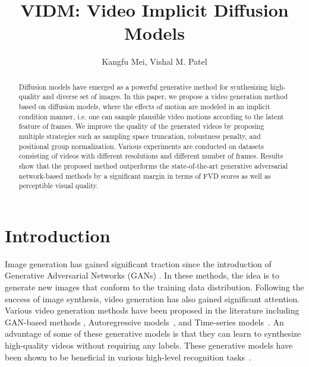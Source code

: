 \documentclass[letterpaper]{article}
\title{VIDM: Video Implicit Diffusion Models}
\author{
    Kangfu Mei,
    Vishal M. Patel
}
\begin{document}

\begin{abstract}
Diffusion models have emerged as a powerful generative method for synthesizing high-quality and diverse set of images.  In this paper, we propose a video generation method based on diffusion models, where the effects of motion are modeled in an implicit condition manner, i.e. one can sample plausible video motions according to the latent feature of frames.  We improve the quality of the generated videos by proposing multiple strategies such as sampling space truncation, robustness penalty, and positional group normalization.  Various experiments are conducted on datasets consisting of videos with different resolutions and different number of frames.  Results show that the proposed method outperforms the state-of-the-art generative adversarial network-based methods by a significant margin in terms of FVD scores as well as perceptible visual quality. 
\end{abstract}

\section{Introduction}
Image generation has gained significant traction since the introduction of Generative Adversarial Networks (GANs) \cite{goodfellow2014generative}.  In these methods, the idea is to generate new images that conform to the training data distribution.  Following the success of image synthesis, video generation has also gained significant attention. Various video generation methods have been proposed in the literature including GAN-based methods \cite{ vondrick2016generating, saito2017temporal, tulyakov2018mocogan, yu2022generating}, Autoregressive models~\cite{Weissenborn2020Scaling}, and Time-series models~\cite{tian2021good, skorokhodov2021stylegan}.  An advantage of some of these generative models is that they can learn to synthesize high-quality videos without requiring any labels.
These generative models have been shown to be beneficial in various high-level recognition tasks~\cite{srivastava2015unsupervised, vondrick2016generating}. 
         
\end{document}
